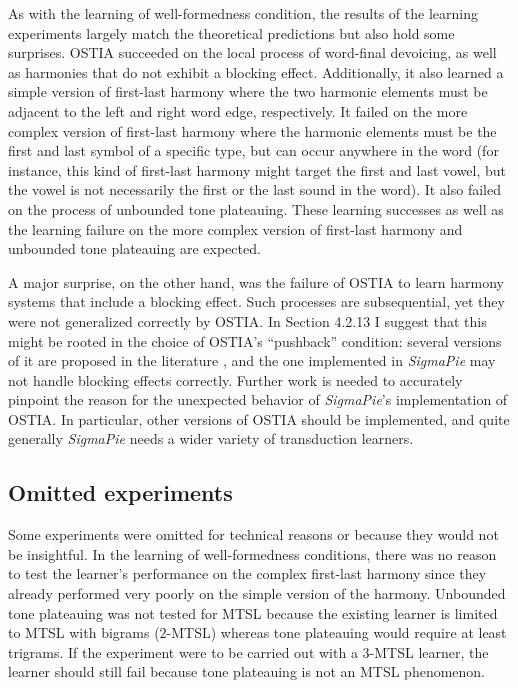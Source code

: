 As with the learning of well-formedness condition, the results of the learning experiments largely match the theoretical predictions but also hold some surprises.
OSTIA succeeded on the local process of word-final devoicing, as well as harmonies that do not exhibit a blocking effect.
Additionally, it also learned a simple version of first-last harmony where the two harmonic elements must be adjacent to the left and right word edge, respectively.
It failed on the more complex version of first-last harmony where the harmonic elements must be the first and last symbol of a specific type, but can occur anywhere in the word (for instance, this kind of first-last harmony might target the first and last vowel, but the vowel is not necessarily the first or the last sound in the word).
It also failed on the process of unbounded tone plateauing.
These learning successes as well as the learning failure on the more complex version of first-last harmony and unbounded tone plateauing are expected.

A major surprise, on the other hand, was the failure of OSTIA to learn harmony systems that include a blocking effect.
Such processes are subsequential, yet they were not generalized correctly by OSTIA\@.
In Section 4.2.13 I suggest that this might be rooted in the choice of OSTIA's ``pushback'' condition: several versions of it are proposed in the literature \citep{OncinaEtAl1993,DeLaHiguera2010,DeLaHiguera2011}, and the one implemented in \emph{SigmaPie} may not handle blocking effects correctly.
Further work is needed to accurately pinpoint the reason for the unexpected behavior of \emph{SigmaPie}'s implementation of OSTIA\@.
In particular, other versions of OSTIA should be implemented, and quite generally \emph{SigmaPie} needs a wider variety of transduction learners.

\subsection{Omitted experiments}
\label{omittedexpsection}

Some experiments were omitted for technical reasons or because they would not be insightful.
In the learning of well-formedness conditions, there was no reason to test the learner's performance on the complex first-last harmony since they already performed very poorly on the simple version of the harmony.
Unbounded tone plateauing was not tested for MTSL because the existing learner is limited to MTSL with bigrams ($2$-MTSL) whereas tone plateauing would require at least trigrams.
If the experiment were to be carried out with a $3$-MTSL learner, the learner should still fail because tone plateauing is not an MTSL phenomenon.

